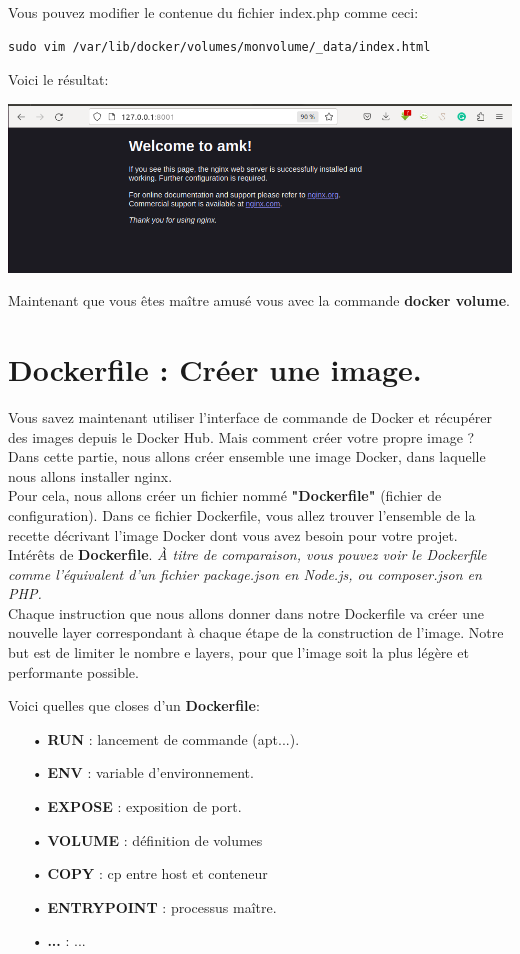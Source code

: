 \documentclass[12pt,a4paper]{article}
\begin{document}
Vous pouvez modifier le contenue du fichier index.php comme ceci:
\begin{verbatim}
sudo vim /var/lib/docker/volumes/monvolume/_data/index.html
\end{verbatim}
Voici le résultat:
\begin{center}
\includegraphics[scale=0.3]{img/docker_volume_n.png}
\end{center}
Maintenant que vous êtes maître amusé vous avec la commande
\textbf{docker volume}.

\section{Dockerfile : Créer une image.}
Vous savez maintenant utiliser l'interface de commande de Docker et récupérer des images depuis le Docker Hub. Mais comment créer votre propre image ?\\
Dans cette partie, nous allons créer ensemble une image Docker, dans laquelle nous allons installer nginx.\\
Pour cela, nous allons créer un fichier nommé \textbf{"Dockerfile"} (fichier de configuration). Dans ce fichier Dockerfile, vous allez trouver l'ensemble de la recette décrivant l'image Docker dont vous avez besoin pour votre projet.\\
Intérêts de \textbf{Dockerfile}.
\textit{À titre de comparaison, vous pouvez voir le Dockerfile comme l'équivalent d'un fichier package.json en Node.js, ou composer.json en PHP. } \\
Chaque instruction que nous allons donner dans notre Dockerfile va créer une nouvelle layer correspondant à chaque étape de la construction de l'image.
Notre but est de limiter le nombre e layers, pour que l'image soit la plus légère et performante possible.

Voici quelles que closes d'un \textbf{Dockerfile}:
\begin{itemize}
\item[•] \textbf{RUN} : lancement de commande (apt...).
\item[•] \textbf{ENV} : variable d'environnement.
\item[•] \textbf{EXPOSE} : exposition de port.
\item[•] \textbf{VOLUME} : définition de volumes
\item[•] \textbf{COPY} : cp entre host et conteneur
\item[•] \textbf{ENTRYPOINT} : processus maître.
\item[•] \textbf{...} : ...
\end{itemize}
\end{document}
